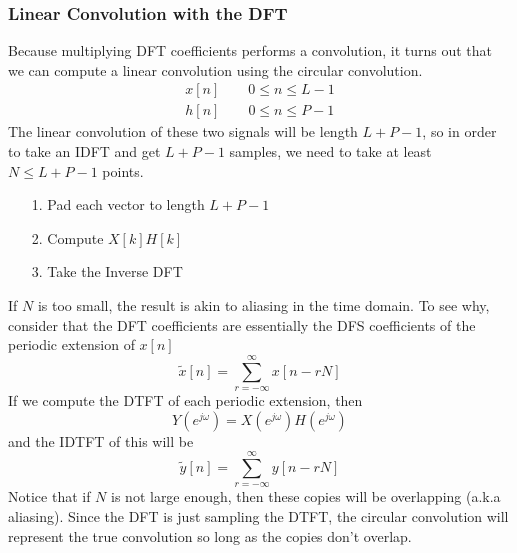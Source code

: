 \documentclass{article}
\begin{document}
\subsubsection{Linear Convolution with the DFT}
Because multiplying DFT coefficients performs a convolution, it turns out that we can compute a linear convolution using the circular convolution.
\begin{align*}
  x[n] \qquad 0\le n\le L-1\\
  h[n] \qquad 0 \le n \le P-1
\end{align*}
The linear convolution of these two signals will be length $L+P-1$, so in order to take an IDFT and get $L+P-1$ samples, we need to
take at least $N\le L+P-1$ points.
\begin{itemize}
  \item[1.] Pad each vector to length $L+P-1$
  \item[2.] Compute $X[k]H[k]$
  \item[3.] Take the Inverse DFT
\end{itemize}
If $N$ is too small, the result is akin to aliasing in the time domain.
To see why, consider that the DFT coefficients are essentially the DFS coefficients of the periodic extension of $x[n]$
$$\tilde{x}[n]=\sum_{r=-\infty}^{\infty}x[n-rN]$$
If we compute the DTFT of each periodic extension, then
$$Y(e^{j\omega})=X(e^{j\omega})H(e^{j\omega})$$ and the IDTFT of this will be
$$\tilde{y}[n] = \sum_{r=-\infty}^{\infty}y[n-rN]$$
Notice that if $N$ is not large enough, then these copies will be overlapping (a.k.a aliasing).
Since the DFT is just sampling the DTFT, the circular convolution will represent the true convolution
so long as the copies don't overlap.
\end{document}
